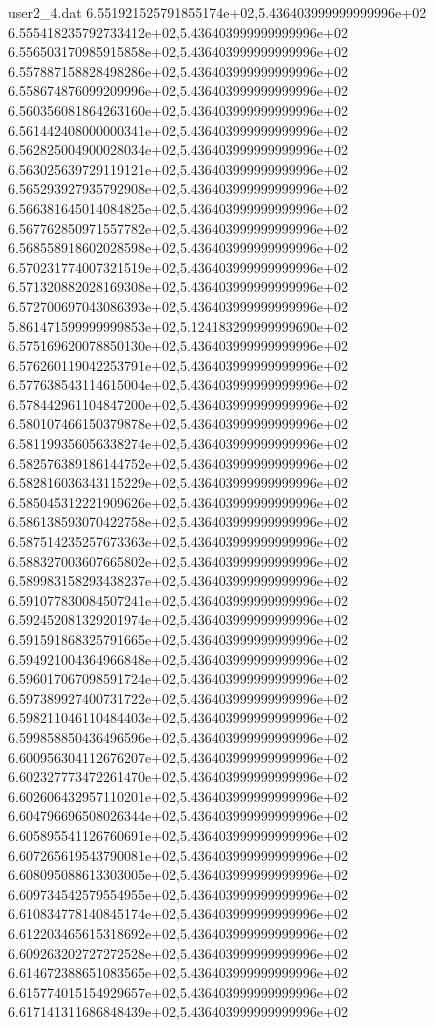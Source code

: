 \begin{filecontents}{user2_4.dat}
6.551921525791855174e+02,5.436403999999999996e+02
6.555418235792733412e+02,5.436403999999999996e+02
6.556503170985915858e+02,5.436403999999999996e+02
6.557887158828498286e+02,5.436403999999999996e+02
6.558674876099209996e+02,5.436403999999999996e+02
6.560356081864263160e+02,5.436403999999999996e+02
6.561442408000000341e+02,5.436403999999999996e+02
6.562825004900028034e+02,5.436403999999999996e+02
6.563025639729119121e+02,5.436403999999999996e+02
6.565293927935792908e+02,5.436403999999999996e+02
6.566381645014084825e+02,5.436403999999999996e+02
6.567762850971557782e+02,5.436403999999999996e+02
6.568558918602028598e+02,5.436403999999999996e+02
6.570231774007321519e+02,5.436403999999999996e+02
6.571320882028169308e+02,5.436403999999999996e+02
6.572700697043086393e+02,5.436403999999999996e+02
5.861471599999999853e+02,5.124183299999999690e+02
6.575169620078850130e+02,5.436403999999999996e+02
6.576260119042253791e+02,5.436403999999999996e+02
6.577638543114615004e+02,5.436403999999999996e+02
6.578442961104847200e+02,5.436403999999999996e+02
6.580107466150379878e+02,5.436403999999999996e+02
6.581199356056338274e+02,5.436403999999999996e+02
6.582576389186144752e+02,5.436403999999999996e+02
6.582816036343115229e+02,5.436403999999999996e+02
6.585045312221909626e+02,5.436403999999999996e+02
6.586138593070422758e+02,5.436403999999999996e+02
6.587514235257673363e+02,5.436403999999999996e+02
6.588327003607665802e+02,5.436403999999999996e+02
6.589983158293438237e+02,5.436403999999999996e+02
6.591077830084507241e+02,5.436403999999999996e+02
6.592452081329201974e+02,5.436403999999999996e+02
6.591591868325791665e+02,5.436403999999999996e+02
6.594921004364966848e+02,5.436403999999999996e+02
6.596017067098591724e+02,5.436403999999999996e+02
6.597389927400731722e+02,5.436403999999999996e+02
6.598211046110484403e+02,5.436403999999999996e+02
6.599858850436496596e+02,5.436403999999999996e+02
6.600956304112676207e+02,5.436403999999999996e+02
6.602327773472261470e+02,5.436403999999999996e+02
6.602606432957110201e+02,5.436403999999999996e+02
6.604796696508026344e+02,5.436403999999999996e+02
6.605895541126760691e+02,5.436403999999999996e+02
6.607265619543790081e+02,5.436403999999999996e+02
6.608095088613303005e+02,5.436403999999999996e+02
6.609734542579554955e+02,5.436403999999999996e+02
6.610834778140845174e+02,5.436403999999999996e+02
6.612203465615318692e+02,5.436403999999999996e+02
6.609263202727272528e+02,5.436403999999999996e+02
6.614672388651083565e+02,5.436403999999999996e+02
6.615774015154929657e+02,5.436403999999999996e+02
6.617141311686848439e+02,5.436403999999999996e+02

\end{filecontents}
